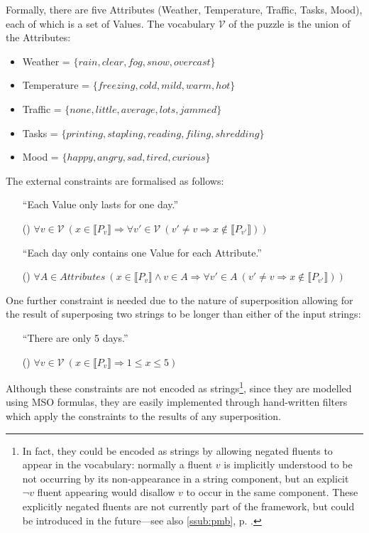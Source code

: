 \documentclass[a4paper,12pt,leqno]{article}
\newcommand{\V}{\mathcal{V}}
\newcommand{\ipp}{(\refstepcounter{equation}\theequation)}
\begin{document}
Formally, there are five Attributes (Weather, Temperature, Traffic, Tasks, Mood), each of which is a set of Values. The vocabulary $\V$ of the puzzle is the union of the Attributes:
\begin{itemize}
	\item Weather = $\{rain,clear,fog,snow,overcast\}$
	\item Temperature = $\{freezing,cold,mild,warm,hot\}$
	\item Traffic = $\{none,little,average,lots,jammed\}$
	\item Tasks = $\{printing,stapling,reading,filing,shredding\}$
	\item Mood = $\{happy,angry,sad,tired,curious\}$
\end{itemize}
The external constraints are formalised as follows:
\begin{itemize}
	\item[] ``Each Value only lasts for one day.''
	\item[\ipp\label{impl:zebra-constraintsA}] $\forall v \in \V~ (x \in \llbracket P_v \rrbracket \Longrightarrow \forall v' \in \V~ (v' \neq v \Rightarrow x \notin \llbracket P_{v'} \rrbracket))$
	\item[] ``Each day only contains one Value for each Attribute.''
	\item[\ipp\label{impl:zebra-constraintsB}] $\forall A \in Attributes~ (x \in \llbracket P_v \rrbracket \wedge v \in A \Longrightarrow \forall v' \in A~ (v' \neq v \Rightarrow x \notin \llbracket P_{v'} \rrbracket))$
\end{itemize}
One further constraint is needed due to the nature of superposition allowing for the result of superposing two strings to be longer than either of the input strings:
\begin{itemize}
	\item[]``There are only 5 days.''
	\item[\ipp\label{impl:zebra-constraintsC}] $\forall v \in \V~ (x \in \llbracket P_v \rrbracket \Longrightarrow 1 \leq x \leq 5)$
\end{itemize}
Although these constraints are not encoded as strings\footnote{In fact, they could be encoded as strings by allowing negated fluents to appear in the vocabulary: normally a fluent $v$ is implicitly understood to be not occurring by its non-appearance in a string component, but an explicit $\neg{}v$ fluent appearing would disallow $v$ to occur in the same component. These explicitly negated fluents are not currently part of the framework, but could be introduced in the future---see also \cref{ssub:pmb}, p. \pageref{ex:drs-example-d}.}, since they are modelled using MSO formulas, they are easily implemented through hand-written filters which apply the constraints to the results of any superposition.
\end{document}
